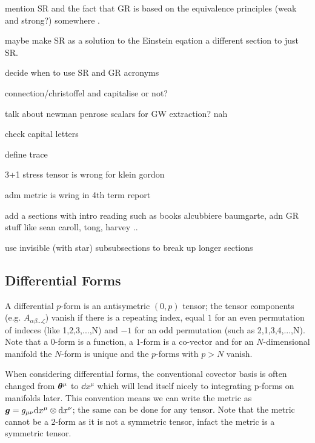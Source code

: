 mention SR and the fact that GR is based on the equivalence principles (weak and strong?) somewhere .

maybe make SR as a solution to the Einstein eqation a different section to just SR.

decide when to use SR and GR acronyms

connection/christoffel and capitalise or not?

talk about newman penrose scalars for GW extraction? nah

check capital letters

define trace

3+1 stress tensor is wrong for klein gordon

adm metric is wring in 4th term report

add a sections with intro reading such as books alcubbiere baumgarte, adn GR stuff like sean caroll, tong, harvey ..

use invisible (with star) subsubsections to break up longer sections




\subsection{Differential Forms}
A differential $p$-form is an antisymetric $(0,p)$ tensor; the tensor components (e.g. $A_{\alpha\beta...\zeta}$) vanish if there is a repeating index, equal $1$ for an even permutation of indeces (like 1,2,3,...,N) and $-1$ for an odd permutation (such as 2,1,3,4,...,N). Note that a $0$-form is a function, a $1$-form is a co-vector and for an $N$-dimensional manifold the $N$-form is unique and the $p$-forms with $p>N$ vanish. 

When considering differential forms, the conventional covector basis is often changed from $\boldsymbol{\theta}^\mu$ to $\dd x^\mu$ which will lend itself nicely to integrating p-forms on manifolds later. This convention means we can write the metric as $\boldsymbol{g} = g_{\mu\nu} \dd x^\mu \otimes \dd x^\nu$; the same can be done for any tensor. Note that the metric cannot be a $2$-form as it is not a symmetric tensor, infact the metric is a symmetric tensor.

